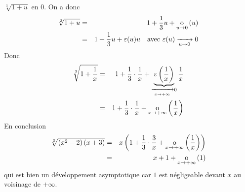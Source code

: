 \documentclass{magnolia}
\begin{document}
\begin{exos}
\begin{sol}
  $\sqrt[3]{1+u}$ en 0. On a donc
  \begin{eqnarray*}
  \sqrt[3]{1+u}
  &=& 1+\frac{1}{3}u+\underset{u \rightarrow 0}{\text{o}}\left(u\right)\\
  &=& 1+\frac{1}{3}u+\varepsilon(u)u
      \quad \text{avec $\varepsilon(u)\xrightarrow[u\rightarrow 0]{}0$}\\
  \end{eqnarray*}
  Donc
  \begin{eqnarray*}
  \sqrt[3]{1+\frac{1}{x}}
  &=& 1+\frac{1}{3}\cdot\frac{1}{x}+
      \underbrace{\varepsilon\left(\frac{1}{x}\right)}_{\xrightarrow[x\rightarrow +\infty]{}0}
      \frac{1}{x}\\
  &=& 1+\frac{1}{3}\cdot\frac{1}{x}+\underset{x \rightarrow +\infty}{\text{o}}\left(\frac{1}{x}\right)
  \end{eqnarray*}
  En conclusion
  \begin{eqnarray*}
  \sqrt[3]{\left(x^2-2\right)\left(x+3\right)}
  &=& x\left(1+\frac{1}{3}\cdot\frac{3}{x}+\underset{x \rightarrow +\infty}{\text{o}}\left(\frac{1}{x}\right)\right)\\
  &=& x+1+\underset{x \rightarrow +\infty}{\text{o}}\left(1\right)
  \end{eqnarray*}
  qui est bien un développement asymptotique car $1$ est négligeable devant
  $x$ au voisinage de $+\infty$.   
  

\end{sol}
\end{exos}
\end{document}
